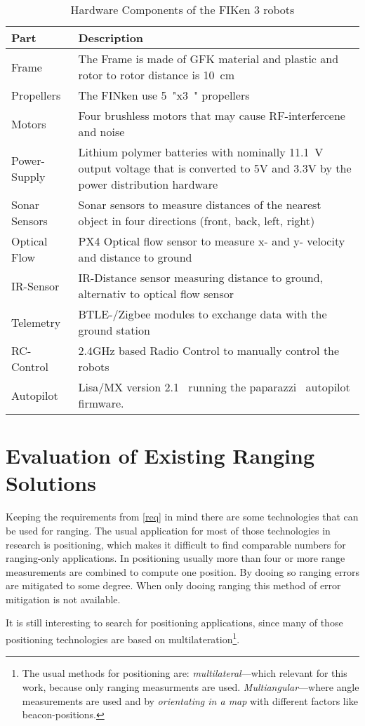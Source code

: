 \begin{table}[h]
	\begin{tabularx}{\columnwidth}{l | X}
	Part & Description \\ \hline
	Frame & The Frame is made of GFK material and plastic and rotor to rotor distance is \SI{10}{\centi\metre} \\
	Propellers & The FINken use \SI{5}{"}x\SI{3}{"} propellers \\
	Motors & Four brushless motors that may cause RF-interfercene and noise \\
	Power-Supply & Lithium polymer batteries with nominally \SI{11.1}{\volt} output voltage that is converted to 5V and 3.3V by the power distribution hardware \\
	Sonar Sensors & Sonar sensors to measure distances of the nearest object in four directions (front, back, left, right) \\
	Optical Flow & PX4 Optical flow sensor to measure x- and y- velocity and distance to ground \\
	IR-Sensor & IR-Distance sensor measuring distance to ground, alternativ to optical flow sensor \\
	Telemetry & BTLE-/Zigbee modules to exchange data with the ground station \\
	RC-Control &  2.4GHz based Radio Control to manually control the robots \\
	Autopilot & Lisa/MX version 2.1~\cite{lisamx} running the paparazzi~\cite{paparazzi} autopilot firmware.
	\end{tabularx}
	\caption{Hardware Components of the FIKen 3 robots}
\end{table}

\section{Evaluation of Existing Ranging Solutions}

Keeping the requirements from \autoref{req} in mind  there are some technologies that can be used for ranging.
The usual application for most of those technologies in research is positioning, which makes it difficult to find comparable numbers for ranging-only applications.
In positioning usually more than four or more range measurements are combined to compute one position.
By dooing so ranging errors are mitigated to some degree.
When only dooing ranging this method of error mitigation is not available.

It is still interesting to search for positioning applications, since many of those positioning technologies are based on multilateration\footnote{The usual methods for positioning are: \emph{multilateral}—which relevant for this work, because only ranging measurments are used. \emph{Multiangular}—where angle measurements are used and by \emph{orientating in a map} with different factors like beacon-positions.}.
\cite{_multilateration_2015}

